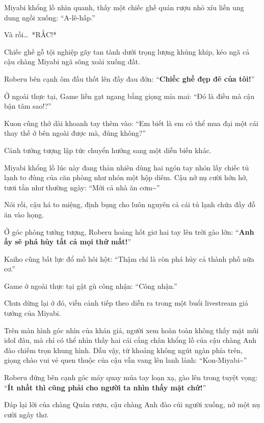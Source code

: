 \documentclass[../main.tex]{subfiles}
\begin{document}

Miyabi khổng lồ nhìn quanh, thấy một chiếc ghế quán rượu nhỏ xíu liền ung dung ngồi xuống: ``A-lê-hấp.''

Và rồi\dots\ *RẮC!*

Chiếc ghế gỗ tội nghiệp gãy tan tành dưới trọng lượng khủng khip, kéo ngã cả cậu chàng Miyabi ngã sõng xoài xuống đất.

Roberu bên cạnh ôm đầu thốt lên đầy đau đớn: ``\textbf{Chiếc ghế đẹp đẽ của tôi!}''

Ở ngoài thực tại, Game liền gạt ngang bằng giọng mỉa mai: ``Đó là điều mà cậu bận tâm sao!?''

Kuon cũng thở dài khoanh tay thêm vào: ``Em biết là em có thể mua đại một cái thay thế ở bên ngoài được mà, đúng không?''

\ct

Cảnh tưởng tượng lập tức chuyển hướng sang một diễn biến khác.

Miyabi khổng lồ lúc này đang thản nhiên dùng hai ngón tay nhón lấy chiếc tủ lạnh to đùng của căn phòng như nhón một hộp diêm. Cậu nở nụ cười hớn hở, tươi tắn như thường ngày: ``Mời cả nhà ăn cơm\~{}''


Nói rồi, cậu há to miệng, định bụng cho luôn nguyên cả cái tủ lạnh chứa đầy đồ ăn vào họng.

Ở góc phòng tưởng tượng, Roberu hoảng hốt giơ hai tay lên trời gào lớn: ``\textbf{Anh ấy sẽ phá hủy tất cả mọi thứ mất!}''

Kaiho cũng bất lực đổ mồ hôi hột: ``Thậm chí là còn phá hủy cả thành phố nữa cơ.''

Game ở ngoài thực tại gật gù công nhận: ``Công nhận.''

\ct

Chưa dừng lại ở đó, viễn cảnh tiếp theo diễn ra trong một buổi livestream giả tưởng của Miyabi.

Trên màn hình góc nhìn của khán giả, người xem hoàn toàn không thấy mặt mũi idol đâu, mà chỉ có thể nhìn thấy hai cái cẳng chân khổng lồ của cậu chàng Anh đào chiếm trọn khung hình. Dẫu vậy, từ khoảng không ngút ngàn phía trên, giọng chào vui vẻ quen thuộc của cậu vẫn vang lên lanh lảnh: ``Kon-Miyabi\~{}''


Roberu đứng bên cạnh góc máy quay múa tay loạn xạ, gào lên trong tuyệt vọng: ``\textbf{Ít nhất thì cũng phải cho người ta nhìn thấy mặt chứ!}''

Đáp lại lời của chàng Quán rượu, cậu chàng Anh đào cúi người xuống, nở một nụ cười ngây thơ.
\end{document}
